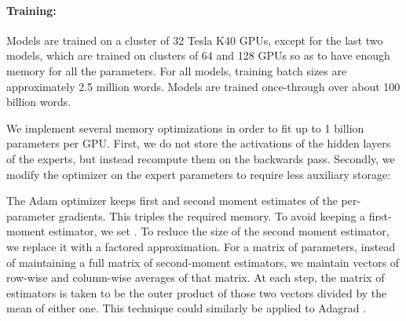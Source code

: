 \documentclass{article} \pdfoutput=1
\begin{document}
\paragraph{Training:}  Models are trained on a cluster of 32 Tesla K40 GPUs, except for the last two models, which are trained on clusters of 64 and 128 GPUs so as to have enough memory for all the parameters.   For all models, training batch sizes are approximately 2.5 million words.  Models are trained once-through over about 100 billion words.

We implement several memory optimizations in order to fit up to 1 billion parameters per GPU.   First, we do not store the activations of the hidden layers of the experts, but instead recompute them on the backwards pass.  Secondly, we modify the optimizer on the expert parameters to require less auxiliary storage:

The Adam optimizer \citep{kingma2014adam} keeps first and second moment estimates of the per-parameter gradients.  This triples the required memory.  To avoid keeping a first-moment estimator, we set .  To reduce the size of the second moment estimator, we replace it with a factored approximation.  For a matrix of parameters, instead of maintaining a full matrix of second-moment estimators, we maintain vectors of row-wise and column-wise averages of that matrix.   At each step, the matrix of estimators is taken to be the outer product of those two vectors divided by the mean of either one.   This technique could similarly be applied to Adagrad \citep{duchi10}.
\end{document}
